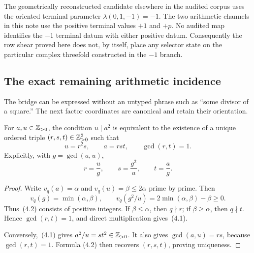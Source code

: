 \begin{remark}
The geometrically reconstructed candidate elsewhere in the audited corpus
uses the oriented terminal parameter
\(\lambda(0,1,-1)=-1\).  The two arithmetic channels in this note use
the positive terminal values \(+1\) and \(+p\).  No audited map identifies
the \(-1\) terminal datum with either positive datum.  Consequently the row
shear proved here does not, by itself, place any selector state on the
particular complex threefold constructed in the \(-1\) branch.
\end{remark}

\subsection{The exact remaining arithmetic incidence}

The bridge can be expressed without an untyped phrase such as ``some divisor
of a square.''  The next factor coordinates are canonical and retain their
orientation.

\begin{lemma}\label{lem:esksb-factors}
For \(a,u\in\mathbb Z_{>0}\), the condition \(u\mid a^2\) is equivalent to the
existence of a unique ordered triple \((r,s,t)\in\mathbb Z_{>0}^3\) such that
\begin{equation}
 u=r^2s,
 \qquad a=rst,
 \qquad \gcd(r,t)=1.                                        \tag{4.1}
\end{equation}
Explicitly, with \(g=\gcd(a,u)\),
\begin{equation}
 r=\frac ug,
 \qquad s=\frac{g^2}{u},
 \qquad t=\frac ag.                                         \tag{4.2}
\end{equation}
\end{lemma}

\begin{proof}
Write \(v_q(a)=\alpha\) and \(v_q(u)=\beta\leq2\alpha\) prime by prime.
Then
\[
 v_q(g)=\min(\alpha,\beta),
 \qquad
 v_q(g^2/u)=2\min(\alpha,\beta)-\beta\geq0.
\]
Thus~(4.2) consists of positive integers.  If \(\beta\leq\alpha\), then
\(q\nmid r\); if \(\beta\geq\alpha\), then \(q\nmid t\).  Hence
\(\gcd(r,t)=1\), and direct multiplication gives~(4.1).

Conversely,~(4.1) gives
\(a^2/u=s t^2\in\mathbb Z_{>0}\).  It also gives
\(\gcd(a,u)=rs\), because \(\gcd(r,t)=1\).  Formula (4.2) then recovers
\((r,s,t)\), proving uniqueness.
\end{proof}

